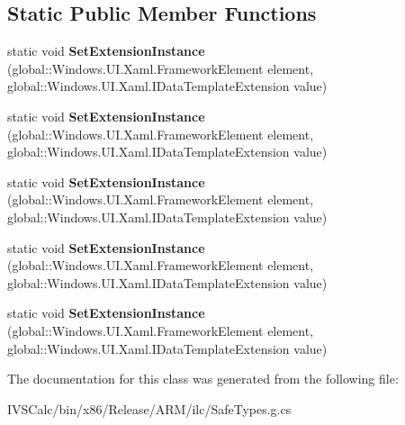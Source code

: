 \subsection*{Static Public Member Functions}
\begin{DoxyCompactItemize}
\item 
\mbox{\label{class_windows_1_1_u_i_1_1_xaml_1_1_data_template_aebf1919695104f2fbb00b459926867d2}} 
static void {\bfseries Set\+Extension\+Instance} (global\+::\+Windows.\+U\+I.\+Xaml.\+Framework\+Element element, global\+::\+Windows.\+U\+I.\+Xaml.\+I\+Data\+Template\+Extension value)
\item 
\mbox{\label{class_windows_1_1_u_i_1_1_xaml_1_1_data_template_aebf1919695104f2fbb00b459926867d2}} 
static void {\bfseries Set\+Extension\+Instance} (global\+::\+Windows.\+U\+I.\+Xaml.\+Framework\+Element element, global\+::\+Windows.\+U\+I.\+Xaml.\+I\+Data\+Template\+Extension value)
\item 
\mbox{\label{class_windows_1_1_u_i_1_1_xaml_1_1_data_template_aebf1919695104f2fbb00b459926867d2}} 
static void {\bfseries Set\+Extension\+Instance} (global\+::\+Windows.\+U\+I.\+Xaml.\+Framework\+Element element, global\+::\+Windows.\+U\+I.\+Xaml.\+I\+Data\+Template\+Extension value)
\item 
\mbox{\label{class_windows_1_1_u_i_1_1_xaml_1_1_data_template_aebf1919695104f2fbb00b459926867d2}} 
static void {\bfseries Set\+Extension\+Instance} (global\+::\+Windows.\+U\+I.\+Xaml.\+Framework\+Element element, global\+::\+Windows.\+U\+I.\+Xaml.\+I\+Data\+Template\+Extension value)
\item 
\mbox{\label{class_windows_1_1_u_i_1_1_xaml_1_1_data_template_aebf1919695104f2fbb00b459926867d2}} 
static void {\bfseries Set\+Extension\+Instance} (global\+::\+Windows.\+U\+I.\+Xaml.\+Framework\+Element element, global\+::\+Windows.\+U\+I.\+Xaml.\+I\+Data\+Template\+Extension value)
\end{DoxyCompactItemize}


The documentation for this class was generated from the following file\+:\begin{DoxyCompactItemize}
\item 
I\+V\+S\+Calc/bin/x86/\+Release/\+A\+R\+M/ilc/Safe\+Types.\+g.\+cs\end{DoxyCompactItemize}
